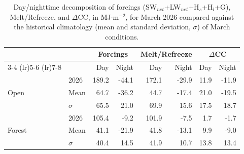 \documentclass[draft]{agujournal2019}
\newcommand{\mjmtwo}{\textcolor{black}{MJ$\cdot$m$^{-2}$}\xspace}
\begin{document}
\begin{table}[h]
\centering
\caption{Day/nighttime decomposition of forcings (SW$_{net}$+LW$_{net}$+H$_s$+H$_l$+G), Melt/Refreeze, and $\Delta$CC, in \mjmtwo, for March 2026 compared against the historical climatology (mean and standard deviation, $\sigma$) of March conditions.}
\label{tab:forest_open_diel_summary}
\begin{tabular}{llrrrrrr}
\toprule
 & & \multicolumn{2}{c}{Forcings} & \multicolumn{2}{c}{Melt/Refreeze} & \multicolumn{2}{c}{$\Delta$CC} \\
\cmidrule(lr){3-4} \cmidrule(lr){5-6} \cmidrule(lr){7-8}
 & & Day & Night & Day & Night & Day & Night \\
\midrule
\multirow{3}{*}{Open}   & 2026 & 189.2 & -44.1 & 172.1 & -29.9 & 11.9 & -11.9 \\
 & Mean & 64.7 & -36.2 & 44.7 & -17.4 & 21.0 & -19.5 \\
 & $\sigma$ & 65.5 & 21.0 & 69.9 & 15.6 & 17.5 & 18.7 \\
\midrule
\multirow{3}{*}{Forest} & 2026 & 105.4 & -9.2 & 101.9 & -7.5 & 1.7 & -1.7 \\
 & Mean & 41.1 & -21.9 & 41.8 & -13.1 & 9.9 & -9.0 \\
 & $\sigma$ & 40.4 & 14.5 & 41.9 & 10.7 & 13.8 & 13.4 \\ 
\bottomrule
\end{tabular}
\end{table}








\clearpage

\end{document}
